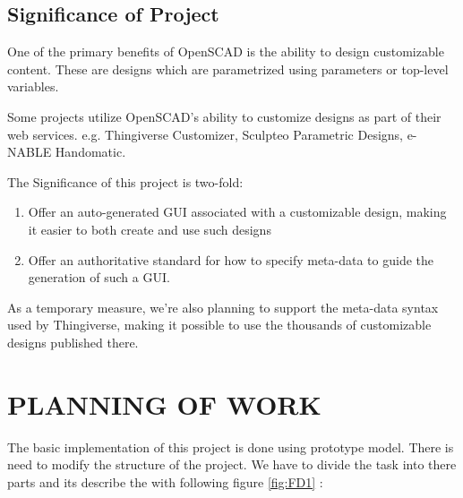 \documentclass[12pt,includeheadfoot,a4paper]{report}
\begin{document}
\section{Significance of Project}

One of the primary benefits of OpenSCAD is the ability to design customizable content. These are designs which are parametrized using parameters or top-level variables.

Some projects utilize OpenSCAD's ability to customize designs as part of their web services.
e.g. Thingiverse Customizer, Sculpteo Parametric Designs, e-NABLE Handomatic.

The Significance of this project is two-fold:
\begin{enumerate}
	\item  Offer an auto-generated GUI associated with a customizable design, making it easier to both create and use such designs
	\item Offer an authoritative standard for how to specify meta-data to guide the generation of such a GUI.
	
\end{enumerate}

As a temporary measure, we're also planning to support the meta-data syntax used by Thingiverse, making it possible to use the thousands of customizable designs published there.




\chapter{PLANNING OF WORK}

The basic implementation of this project is done using prototype model. There is need to modify the structure of the project. We have to divide the task into there parts and its describe the with following figure \ref{fig:FD1} :
\end{document}
